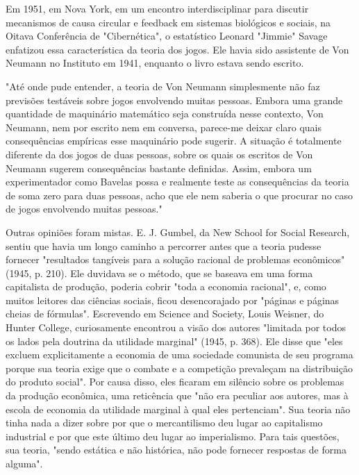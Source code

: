 \documentclass[a4paper,12pt]{article}[abntex2]
\begin{document}
Em 1951, em Nova York, em um encontro interdisciplinar para discutir mecanismos de causa circular e feedback em sistemas biológicos e sociais, na Oitava Conferência de "Cibernética", o estatístico Leonard "Jimmie" Savage enfatizou essa característica da teoria dos jogos. Ele havia sido assistente de Von Neumann no Instituto em 1941, enquanto o livro estava sendo escrito.

"Até onde pude entender, a teoria de Von Neumann simplesmente não faz previsões testáveis sobre jogos envolvendo muitas pessoas. Embora uma grande quantidade de maquinário matemático seja construída nesse contexto, Von Neumann, nem por escrito nem em conversa, parece-me deixar claro quais consequências empíricas esse maquinário pode sugerir. A situação é totalmente diferente da dos jogos de duas pessoas, sobre os quais os escritos de Von Neumann sugerem consequências bastante definidas. Assim, embora um experimentador como Bavelas possa e realmente teste as consequências da teoria de soma zero para duas pessoas, acho que ele nem saberia o que procurar no caso de jogos envolvendo muitas pessoas."

Outras opiniões foram mistas. E. J. Gumbel, da New School for Social Research, sentiu que havia um longo caminho a percorrer antes que a teoria pudesse fornecer "resultados tangíveis para a solução racional de problemas econômicos" (1945, p. 210). Ele duvidava se o método, que se baseava em uma forma capitalista de produção, poderia cobrir "toda a economia racional", e, como muitos leitores das ciências sociais, ficou desencorajado por "páginas e páginas cheias de fórmulas". Escrevendo em Science and Society, Louis Weisner, do Hunter College, curiosamente encontrou a visão dos autores "limitada por todos os lados pela doutrina da utilidade marginal" (1945, p. 368). Ele disse que "eles excluem explicitamente a economia de uma sociedade comunista de seu programa porque sua teoria exige que o combate e a competição prevaleçam na distribuição do produto social". Por causa disso, eles ficaram em silêncio sobre os problemas da produção econômica, uma reticência que "não era peculiar aos autores, mas à escola de economia da utilidade marginal à qual eles pertenciam". Sua teoria não tinha nada a dizer sobre por que o mercantilismo deu lugar ao capitalismo industrial e por que este último deu lugar ao imperialismo. Para tais questões, sua teoria, "sendo estática e não histórica, não pode fornecer respostas de forma alguma".
\end{document}
